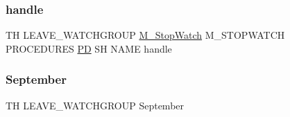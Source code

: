 \subsubsection{\texorpdfstring{handle}{handle}}
{\footnotesize\ttfamily TH L\+E\+A\+V\+E\+\_\+\+W\+A\+T\+C\+H\+G\+R\+O\+UP \hyperlink{option__stopwatch_83_8txt_aa2011fc45a5e502e87ee50996a8a9305}{M\+\_\+\+Stop\+Watch} M\+\_\+\+S\+T\+O\+P\+W\+A\+T\+CH P\+R\+O\+C\+E\+D\+U\+R\+ES \hyperlink{what__overview_81_8txt_a85f26da5a4481fbdb0d9c79f2b94de3e}{PD} SH N\+A\+ME handle}

\mbox{\label{leave__watchgroup_83_8txt_a8e1188b87805533bd2487a085d0d7b3d}} 
\subsubsection{\texorpdfstring{September}{September}}
{\footnotesize\ttfamily TH L\+E\+A\+V\+E\+\_\+\+W\+A\+T\+C\+H\+G\+R\+O\+UP September}

